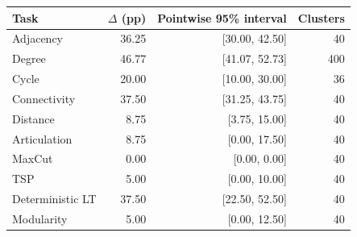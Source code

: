 \begin{tabular}{lrrr}
\toprule
Task & $\Delta$ (pp) & Pointwise 95\% interval & Clusters \\
\midrule
Adjacency & 36.25 & [30.00, 42.50] & 40 \\
Degree & 46.77 & [41.07, 52.73] & 400 \\
Cycle & 20.00 & [10.00, 30.00] & 36 \\
Connectivity & 37.50 & [31.25, 43.75] & 40 \\
Distance & 8.75 & [3.75, 15.00] & 40 \\
Articulation & 8.75 & [0.00, 17.50] & 40 \\
MaxCut & 0.00 & [0.00, 0.00] & 40 \\
TSP & 5.00 & [0.00, 10.00] & 40 \\
Deterministic LT & 37.50 & [22.50, 52.50] & 40 \\
Modularity & 5.00 & [0.00, 12.50] & 40 \\
\bottomrule
\end{tabular}
